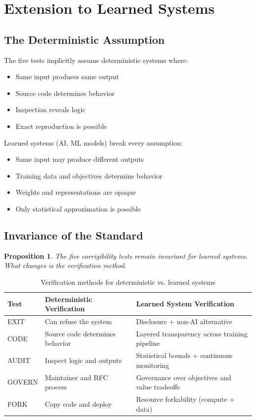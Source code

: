\documentclass[11pt,a4paper]{article}
\newtheorem{proposition}{Proposition}
\begin{document}
\section{Extension to Learned Systems}

\subsection{The Deterministic Assumption}

The five tests implicitly assume deterministic systems where:
\begin{itemize}
    \item Same input produces same output
    \item Source code determines behavior
    \item Inspection reveals logic
    \item Exact reproduction is possible
\end{itemize}

Learned systems (AI, ML models) break every assumption:
\begin{itemize}
    \item Same input may produce different outputs
    \item Training data and objectives determine behavior
    \item Weights and representations are opaque
    \item Only statistical approximation is possible
\end{itemize}

\subsection{Invariance of the Standard}

\begin{proposition}
The five corrigibility tests remain invariant for learned systems. What changes is the verification method.
\end{proposition}

\begin{table}[htbp]
\centering
\begin{tabular}{@{}lll@{}}
\toprule
\textbf{Test} & \textbf{Deterministic Verification} & \textbf{Learned System Verification} \\
\midrule
EXIT & Can refuse the system & Disclosure + non-AI alternative \\
CODE & Source code determines behavior & Layered transparency across training pipeline \\
AUDIT & Inspect logic and outputs & Statistical bounds + continuous monitoring \\
GOVERN & Maintainer and RFC process & Governance over objectives and value tradeoffs \\
FORK & Copy code and deploy & Resource forkability (compute + data) \\
\bottomrule
\end{tabular}
\caption{Verification methods for deterministic vs. learned systems}
\end{table}
\end{document}
